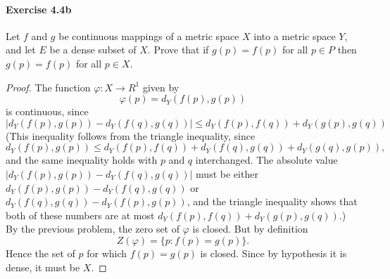\documentclass{article}
\theoremstyle{definition}
\begin{document}
\paragraph{Exercise 4.4b} Let $f$ and $g$ be continuous mappings of a metric space $X$ into a metric space $Y$, and let $E$ be a dense subset of $X$. Prove that if $g(p) = f(p)$ for all $p \in P$ then $g(p) = f(p)$ for all $p \in X$.
\begin{proof}
    The function $\varphi: X \rightarrow R^1$ given by
$$
\varphi(p)=d_Y(f(p), g(p))
$$
is continuous, since
$$
\left|d_Y(f(p), g(p))-d_Y(f(q), g(q))\right| \leq d_Y(f(p), f(q))+d_Y(g(p), g(q))
$$
(This inequality follows from the triangle inequality, since
$$
d_Y(f(p), g(p)) \leq d_Y(f(p), f(q))+d_Y(f(q), g(q))+d_Y(g(q), g(p)),
$$
and the same inequality holds with $p$ and $q$ interchanged. The absolute value $\left|d_Y(f(p), g(p))-d_Y(f(q), g(q))\right|$ must be either $d_Y(f(p), g(p))-d_Y(f(q), g(q))$ or $d_Y(f(q), g(q))-d_Y(f(p), g(p))$, and the triangle inequality shows that both of these numbers are at most $d_Y(f(p), f(q))+d_Y(g(p), g(q))$.)
By the previous problem, the zero set of $\varphi$ is closed. But by definition
$$
Z(\varphi)=\{p: f(p)=g(p)\} .
$$
Hence the set of $p$ for which $f(p)=g(p)$ is closed. Since by hypothesis it is dense, it must be $X$.
\end{proof}
\end{document}
